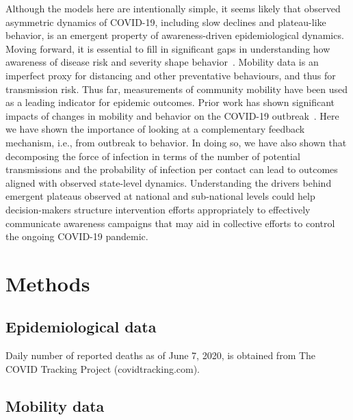 Although the models here are intentionally simple,
it seems likely that observed asymmetric dynamics of COVID-19, including
slow declines and plateau-like behavior, is an emergent
property of awareness-driven epidemiological dynamics.
%
%
Moving forward, it is essential to fill in significant
gaps in understanding how awareness of disease
risk and severity shape behavior~\citep{west_nat2020}. 
Mobility data is an imperfect proxy for distancing and other preventative behaviours, and thus for transmission risk.
Thus far, measurements of community
mobility have been
used as a leading indicator for epidemic outcomes.
Prior work has shown significant impacts of changes
in mobility and behavior on the COVID-19 outbreak~\citep{kraemer_2020sci}.
Here we have
shown the importance of looking at a complementary feedback
mechanism,
i.e., from outbreak to behavior.  
In doing so, we have also shown that decomposing the 
force of infection in terms of the number of potential
transmissions and the probability of infection per contact
can lead to outcomes aligned with observed state-level dynamics.
Understanding the drivers behind emergent plateaus observed at national and sub-national levels could help decision-makers structure intervention efforts appropriately to effectively communicate awareness campaigns that may aid in collective efforts to control the ongoing COVID-19 pandemic.

\section{Methods}

\subsection{Epidemiological data}

Daily number of reported deaths as of June 7, 2020, is obtained from The COVID Tracking Project (covidtracking.com).

\subsection{Mobility data}

